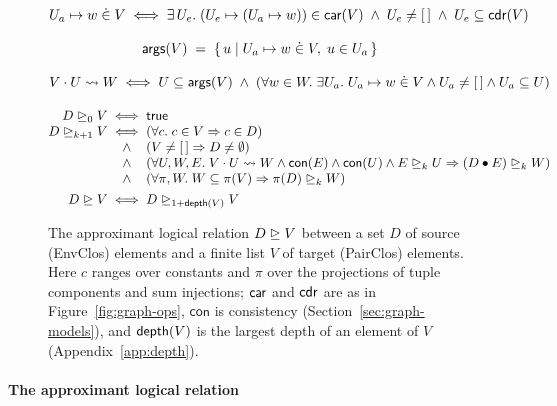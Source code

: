 \begin{figure}[t]
\small\figdefs
{}
\[
\begin{array}{@{}r@{\;}c@{\;}l@{}}
  \entryin{U_a}{w}{V} & \iff &
    \exists\, U_e.\;
    (U_e \mapsto (U_a \mapsto w)) \in \car(V)
    \;\land\; U_e \neq [\,]
    \;\land\; U_e \subseteq \cdr(V)
\end{array}
\]

\[
  \mathsf{args}(V) \;=\; \{\, u \mid U_a \mapsto w \mathrel{\dot{\in}} V,\; u \in U_a \,\}
\]

\[
  V \cdot U \leadsto W \iff
    U \subseteq \mathsf{args}(V) \;\land\;
    (\forall w \in W.\; \exists U_a.\; U_a \mapsto w \mathrel{\dot{\in}} V
      \land U_a \neq [\,] \land U_a \subseteq U)
\]

\[
\begin{array}{@{}r@{\;}c@{\;}l@{}}
  D \ALR_0 V & \iff & \mathsf{true}\\
  D \ALR_{k+1} V & \iff &
    (\forall c.\; c \in V \Rightarrow c \in D)\\
  & \land & (V \neq [\,] \Rightarrow D \neq \emptyset)\\
  & \land & (\forall U, W, E.\;
     \callsto{V}{U}{W} \land \mathsf{con}(E) \land \mathsf{con}(U)
     \land E \ALR_k U \Rightarrow (D \app E) \ALR_k W)\\
  & \land & (\forall \pi, W.\; W \subseteq \pi(V) \Rightarrow \pi(D) \ALR_k W)\\[4pt]
  D \ALR V & \iff & D \ALR_{1 + \depth(V)} V
\end{array}
\]
\caption{The approximant logical relation $D \mathrel{\trianglerighteq} V$ between a set $D$
  of source (EnvClos) elements and a finite list $V$ of target (PairClos)
  elements. Here $c$
  ranges over constants and $\pi$ over the projections of tuple
    components and sum injections; $\mathsf{car}$ and $\mathsf{cdr}$ are as in
  Figure~\ref{fig:graph-ops}, $\mathsf{con}$ is consistency
  (Section~\ref{sec:graph-models}), and $\mathsf{depth}(V)$ is the largest
  depth of an element of $V$ (Appendix~\ref{app:depth}).}
\label{fig:alr}
\end{figure}

\paragraph{The approximant logical relation}

